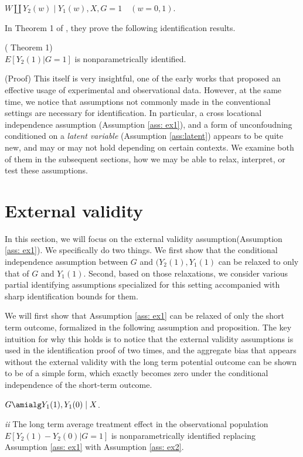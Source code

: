 \documentclass{article}
\begin{document}
\begin{assumption} \label{ass:latent}
    $W \amalg Y_2(w) \mid Y_1(w), X, G=1\quad(w =0,1)$.
\end{assumption}

In Theorem 1 of \cite{athey2020combining}, they prove the following identification results. 
\begin{theorem}( \cite{athey2020combining} Theorem 1)\\
$E[ Y_2(1) | G = 1 ]$ is nonparametrically identified. 
\end{theorem}
(Proof)
This itself is very insightful, one of the early works that proposed an effective usage of experimental and observational data. However, at the same time, we notice that assumptions not commonly made in the conventional settings are necessary for identification. In particular, a cross locational independence assumption (Assumption \ref{ass: ex1}), and a form of unconfoudning conditioned on a \textit{latent variable} (Assumption \ref{ass:latent}) appears to be quite new, and may or may not hold depending on certain contexts. We examine both of them in the subsequent sections, how we may be able to relax, interpret, or test these assumptions.

\section{External validity}
In this section, we will focus on the external validity assumption(Assumption \ref{ass: ex1}). We specifically do two things. We first show that the conditional independence assumption between $G$ and $(Y_2(1), Y_1(1)$ can be relaxed to only that of $G$ and $Y_1(1)$. Second, based on those relaxations, we consider various partial identifying assumptions specialized for this setting accompanied with  sharp identification bounds for them. 

We will first show that Assumption \ref{ass: ex1} can be relaxed  of only the short term outcome, formalized in the following assumption and proposition. The key intuition for why this holds is to notice that the external validity assumptions is used in the identification proof of \cite{athey2020combining} two times, and the aggregate bias that appears without the external validity with the long term potential outcome can be shown to be of a simple form, which exactly becomes zero under the conditional independence of the short-term outcome.
\begin{assumption}\label{ass: ex2}
    $G \amialg Y_1(1) ,Y_1(0) \mid X$.
\end{assumption}
\begin{proposition}
\textit{ii}    The long term average treatment effect in the observational population $ E[Y_2(1) -Y_2(0) | G=1]$ is nonparametrically identified replacing Assumption \ref{ass: ex1} with Assumption \ref{ass: ex2}.
\end{proposition}
\end{document}
